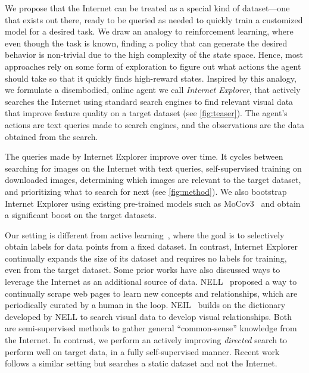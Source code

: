 We propose that the Internet can be treated as a special kind of dataset---one that exists out there, ready to be queried as needed to quickly train a customized model for a desired task.
We draw an analogy to reinforcement learning, where even though the task is known, finding a policy that can generate the desired behavior is non-trivial due to the high complexity of the state space. Hence, most approaches rely on some form of exploration to figure out what actions the agent should take so that it quickly finds high-reward states. Inspired by this analogy, we formulate a disembodied, online agent we call {\em Internet Explorer}, that actively searches the Internet using standard search engines to find relevant visual data that improve feature quality on a target dataset (see \cref{fig:teaser}). The agent's actions are text queries made to search engines, and the observations are the data obtained from the search.

The queries made by Internet Explorer improve over time. It cycles between searching for images on the Internet with text queries, self-supervised training on downloaded images, determining which images are relevant to the target dataset, and prioritizing what to search for next (see \cref{fig:method}). We also bootstrap Internet Explorer using existing pre-trained models such as MoCov3~\cite{he2020momentum} and obtain a significant boost on the target datasets.

Our setting is different from active learning~\cite{settles2009active}, where the goal is to selectively obtain labels for data points from a fixed dataset. In contrast, Internet Explorer continually expands the size of its dataset and requires no labels for training, even from the target dataset.
Some prior works have also discussed ways to leverage the Internet as an additional source of data. NELL~\cite{carlson2010toward} proposed a way to continually scrape web pages to learn new concepts and relationships, which are periodically curated by a human in the loop. NEIL~\cite{chen2013neil} builds on the dictionary developed by NELL to search visual data to develop visual relationships. Both are semi-supervised methods to gather general ``common-sense'' knowledge from the Internet. In contrast, we perform an actively improving \textit{directed} search to perform well on target data, in a fully self-supervised manner. Recent work~\cite{jiang2021improving} follows a similar setting but searches a static dataset and not the Internet.


